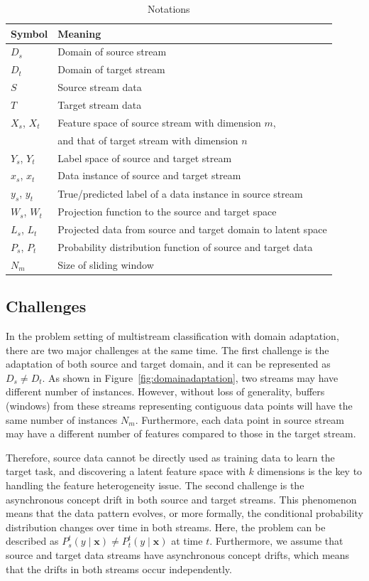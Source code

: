 \begin{table}[t]
\centering
\caption{Notations}
\label{tab:notations}
\begin{tabular}{|l|l|}
\hline
Symbol & Meaning \\ \hline
 $D_{s}$ & Domain of source stream \\ \hline
 $D_{t}$ & Domain of target stream \\ \hline
 $S$ & Source stream data\\ \hline
 $T$ & Target stream data \\ \hline
 $X_{s}$, $X_{t}$ & Feature space of source stream with dimension $m$, \\
  & and that of target stream with dimension $n$\\ \hline
 $Y_{s}$, $Y_{t}$ & Label space of source and target stream \\ \hline
 $x_{s}$, $x_{t}$ & Data instance of source and target stream \\ \hline
 $y_{s}$, $y_{t}$ & True/predicted label of a data instance in source stream \\ \hline
 $W_{s}$, $W_{t}$ & Projection function to the source and target space \\ \hline
 $L_{s}$, $L_{t}$ & Projected data from source and target domain to latent space \\ \hline
 $P_{s}$, $P_{t}$ & Probability distribution function of source and target data \\ \hline 
 $N_{m}$ & Size of sliding window \\ \hline
\end{tabular}
\end{table}

\subsection{Challenges}
In the problem setting of multistream classification with domain adaptation, there are two major challenges at the same time.
The first challenge is the adaptation of both source and target domain, and it can be represented as $D_{s} \neq D_{t}$. As shown in Figure~\ref{fig:domainadaptation}, two streams may have different number of instances. However, without loss of generality, buffers (windows) from these streams representing contiguous data points will have the same number of instances $N_m$. Furthermore, each data point in source stream may have a different number of features compared to those in the target stream.

Therefore, source data cannot be directly used as training data to learn the target task, 
and discovering a latent feature space with $k$ dimensions is the key to handling the feature heterogeneity issue.
The second challenge is the asynchronous concept drift in both source and target streams. 
This phenomenon means that the data pattern evolves, or more formally, the conditional probability distribution changes over time in both streams. 
Here, the problem can be described as $P_{s}^{t}(y \mid \mathbf{x}) \neq P_{t}^{t}(y \mid \mathbf{x})$ at time $t$. Furthermore, we assume that source and target data streams have asynchronous concept drifts,
which means that the drifts in both streams occur independently. 

